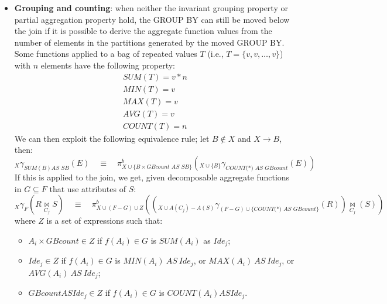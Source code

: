\begin{itemize}
    In $_X \gamma_F (R \underset{C_j}{\bowtie} S)$, $R$ has the \textbf{early partial aggregation property} if all aggregate functions are decomposable and only use attributes of $R$. If $R$ does not have the invariant grouping property because condition 1 does not hold, but has the early partial aggregation property, then:
    \begin{equation*}
        _X \gamma_F (R \underset{C_j}{\bowtie} S) \equiv _X \gamma_{F_g} (({_{X \cup A(C_j) - A(S)}} \gamma_{F_l} (R))\underset{C_j}{\bowtie} (S))
    \end{equation*}
    i.e., the data is grouped once with the local aggregate function on $R$, and a second time over the result of the join with the global aggregate function.
    \item \textbf{Grouping and counting}: when neither the invariant grouping property or partial aggregation property hold, the GROUP BY can still be moved below the join if it is possible to derive the aggregate function values from the number of elements in the partitions generated by the moved GROUP BY. Some functions applied to a bag of repeated values $T$ (i.e., $T = \{v, v, \ldots, v\}$) with $n$ elements have the following property:
    \begin{gather*}
        SUM(T) = v * n \\
        MIN(T) = v \\
        MAX(T) = v \\
        AVG(T) = v \\
        COUNT(T) = n
    \end{gather*}
    We can then exploit the following equivalence rule; let $B \not \in X$ and $X \rightarrow B$, then:
    \begin{equation*}
        _X \gamma_{SUM(B) \textit{AS SB}}(E) \quad \equiv \quad \pi^b_{X \cup \{ B \times \textit{GBcount AS SB}\}}(_{X \cup \{ B \}} \gamma_{\textit{COUNT(*) AS GBcount}}(E))
    \end{equation*}
    If this is applied to the join, we get, given decomposable aggregate functions in $G \subseteq F$ that use attributes of $S$:
    \begin{equation*}
        _X \gamma_F (R \underset{C_j}{\bowtie} S) \quad \equiv \quad \pi^b_{X \cup (F - G) \cup Z} ((_{X \cup A(C_j) - A(S)} \gamma_{(F-G) \cup \{\textit{COUNT(*) AS GBcount}\}}(R)) \underset{C_j}{\bowtie} (S))
    \end{equation*}
    where $Z$ is a set of expressions such that:
    \begin{itemize}[noitemsep]
        \item $A_i \times \textit{GBcount} \in Z$ if $f(A_i) \in G$ is $SUM(A_i)$ as $Ide_j$;
        \item \sloppy $Ide_j \in Z$ if $f(A_i) \in G$ is $\textit{MIN}(A_i) \ AS \ Ide_j$, or $\textit{MAX}(A_i) \ AS \ Ide_j$, or $\textit{AVG}(A_i) \ AS \ Ide_j$;
        \item $\textit{GBcount} AS Ide_j \in Z$ if $f(A_i) \in G$ is $\textit{COUNT}(A_i) AS Ide_j$.
    \end{itemize}
\end{itemize}

